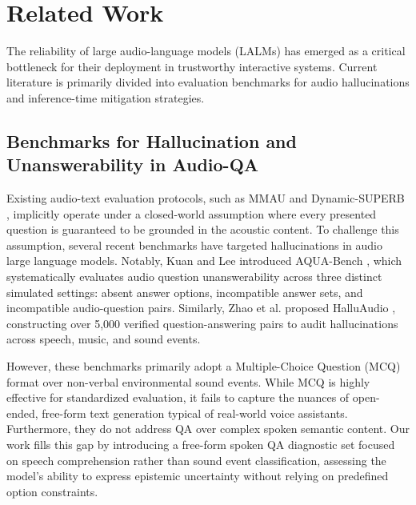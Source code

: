 
\section{Related Work}
\label{sec:related_work}

The reliability of large audio-language models (LALMs) has emerged as a critical bottleneck for their deployment in trustworthy interactive systems. Current literature is primarily divided into evaluation benchmarks for audio hallucinations and inference-time mitigation strategies.

\subsection{Benchmarks for Hallucination and Unanswerability in Audio-QA}
Existing audio-text evaluation protocols, such as MMAU \cite{sakshi2024mmau} and Dynamic-SUPERB \cite{huang2024dynamicsuperb}, implicitly operate under a closed-world assumption where every presented question is guaranteed to be grounded in the acoustic content. To challenge this assumption, several recent benchmarks have targeted hallucinations in audio large language models. Notably, Kuan and Lee introduced AQUA-Bench \cite{kuan2026aquabench}, which systematically evaluates audio question unanswerability across three distinct simulated settings: absent answer options, incompatible answer sets, and incompatible audio-question pairs. Similarly, Zhao et al. proposed HalluAudio \cite{zhao2026halluaudio}, constructing over 5,000 verified question-answering pairs to audit hallucinations across speech, music, and sound events. 

However, these benchmarks primarily adopt a Multiple-Choice Question (MCQ) format over non-verbal environmental sound events. While MCQ is highly effective for standardized evaluation, it fails to capture the nuances of open-ended, free-form text generation typical of real-world voice assistants. Furthermore, they do not address QA over complex spoken semantic content. Our work fills this gap by introducing a free-form spoken QA diagnostic set focused on speech comprehension rather than sound event classification, assessing the model's ability to express epistemic uncertainty without relying on predefined option constraints.

